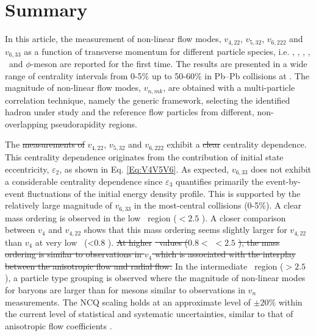 \documentclass[ALICE,manyauthors]{cernphprep}
\providecommand{\DIFaddtex}[1]{{\protect\color{blue}\uwave{#1}}} %
\providecommand{\DIFdeltex}[1]{{\protect\color{red}\sout{#1}}}                      %
\providecommand{\DIFaddbegin}{} %
\providecommand{\DIFaddend}{} %
\providecommand{\DIFdelbegin}{} %
\providecommand{\DIFdelend}{} %
\providecommand{\DIFadd}[1]{\texorpdfstring{\DIFaddtex{#1}}{#1}} %
\providecommand{\DIFdel}[1]{\texorpdfstring{\DIFdeltex{#1}}{}} %
\newcommand{\DIFscaledelfig}{0.5}
\newlength{\DIFdelgraphicswidth} %
\newlength{\DIFdelgraphicsheight} %
\newcommand{\DIFaddincludegraphics}[2][]{{\color{blue}\fbox{\DIFOincludegraphics[#1]{#2}}}} %
\newcommand{\DIFdelincludegraphics}[2][]{%
\sbox{\DIFdelgraphicsbox}{\DIFOincludegraphics[#1]{#2}}%
\settoboxwidth{\DIFdelgraphicswidth}{\DIFdelgraphicsbox} %
\settoboxtotalheight{\DIFdelgraphicsheight}{\DIFdelgraphicsbox} %
\scalebox{\DIFscaledelfig}{%
\parbox[b]{\DIFdelgraphicswidth}{\usebox{\DIFdelgraphicsbox}\\[-\baselineskip] \rule{\DIFdelgraphicswidth}{0em}}\llap{\resizebox{\DIFdelgraphicswidth}{\DIFdelgraphicsheight}{%
\setlength{\unitlength}{\DIFdelgraphicswidth}%
\begin{picture}(1,1)%
\thicklines\linethickness{2pt} %
{\color[rgb]{1,0,0}\put(0,0){\framebox(1,1){}}}%
{\color[rgb]{1,0,0}\put(0,0){\line( 1,1){1}}}%
{\color[rgb]{1,0,0}\put(0,1){\line(1,-1){1}}}%
\end{picture}%
}\hspace*{3pt}}} %
} %
\DeclareRobustCommand{\DIFaddbegin}{\DIFOaddbegin \let\includegraphics\DIFaddincludegraphics} %
\DeclareRobustCommand{\DIFaddend}{\DIFOaddend \let\includegraphics\DIFOincludegraphics} %
\DeclareRobustCommand{\DIFdelbegin}{\DIFOdelbegin \let\includegraphics\DIFdelincludegraphics} %
\DeclareRobustCommand{\DIFdelend}{\DIFOaddend \let\includegraphics\DIFOincludegraphics} %
\begin{document}
\newpage
\newpage

\section{Summary}
\label{Sec:conclusion}

In this article, the measurement of non-linear flow modes, $v_{4,22}$, $v_{5,32}$, $v_{6,222}$ and $v_{6,33}$ as a function of transverse momentum for different particle species, i.e. \pion, \kaon, \Ks, \proton, \lambdas~and $\phi$-meson are reported for the first time. The results are presented in a wide range of centrality intervals from 0-5\% up to 50-60\% in Pb--Pb collisions at \sNN. The magnitude of non-linear flow modes, $v_{n,mk}$, are obtained with a multi-particle correlation technique, namely the generic framework, selecting the identified hadron under study and the reference flow particles from different, non-overlapping pseudorapidity regions.  

The \DIFdelbegin \DIFdel{measurements of }\DIFdelend \DIFaddbegin \DIFadd{measured }\DIFaddend $v_{4,22}$, $v_{5,32}$ and $v_{6,222}$ exhibit a \DIFdelbegin \DIFdel{clear }\DIFdelend \DIFaddbegin \DIFadd{distinct }\DIFaddend centrality dependence. This centrality dependence originates from the contribution of initial state eccentricity, $\varepsilon_{2}$, as shown in Eq. \ref{Eq:V4V5V6}. As expected, $v_{6,33}$ does not exhibit a considerable centrality dependence since $\varepsilon_{3}$ quantifies primarily the event-by-event fluctuations of the initial energy density profile. This is supported by the relatively large magnitude of $v_{6,33}$ in the most-central collisions (0-5\%). A clear mass ordering is observed in the low \pT~region (\pT$< 2.5$ \GeV). A closer comparison between $v_{4}$ and $v_{4,22}$ shows that this mass ordering seems slightly larger for $v_{4,22}$ than $v_{4}$ at very low \pT~(\pT<0.8 \GeV). \DIFdelbegin \DIFdel{At higher }%
\DIFdel{~values ($0.8<$}%
\DIFdel{$< 2.5$ }%
\DIFdel{), the mass ordering is similar to observations in $v_{4}$ which is associated with the interplay between the anisotropic flow and radial flow. }\DIFdelend %
In the intermediate \pT~region (\pT$> 2.5$ \GeV), a particle type grouping is observed where the magnitude of non-linear modes for baryons are larger than for mesons similar to observations in $v_{n}$ measurements. The NCQ scaling holds at an approximate level of $\pm 20$\% within the current level of statistical and systematic uncertainties, similar to that of anisotropic flow coefficients \cite{Acharya:2018zuq}. 
\end{document}
